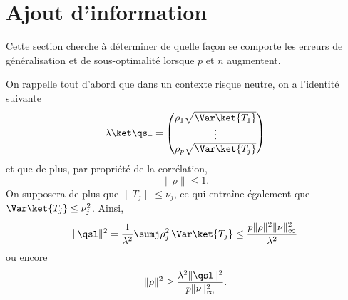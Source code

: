 \section{Ajout d'information}

Cette section cherche à déterminer de quelle façon se comporte les erreurs de
généralisation et de sous-optimalité lorsque $p$ et $n$ augmentent.

On rappelle tout d'abord que dans un contexte risque neutre, on a l'identité suivante
\begin{equation}
  \lambda\ket\qsl =
  \begin{pmatrix}
    \rho_1\sqrt{\Var\ket{T_1}}\\
    \vdots\\
    \rho_p\sqrt{\Var\ket{T_j}}
  \end{pmatrix}
\end{equation}
et que de plus, par propriété de la corrélation,
\begin{equation}
  \|\rho\|\leq 1.
\end{equation}
On supposera de plus que $\|T_j\| \leq \nu_j$, ce qui entraîne également que $\Var\ket{T_j} \leq
\nu_j^2$. Ainsi,
\begin{equation}
  \|\qsl\|^2 = \frac{1}{\lambda^2}\sumj \rho_j^2\,\Var\ket{T_j} \leq \frac{p\|\rho\|^2\|\nu\|^2_\infty}{\lambda^2}
\end{equation}
ou encore
\begin{equation}
  \|\rho\|^2 \geq \frac{\lambda^2\|\qsl\|^2}{p\|\nu\|^2_\infty}.
\end{equation}

